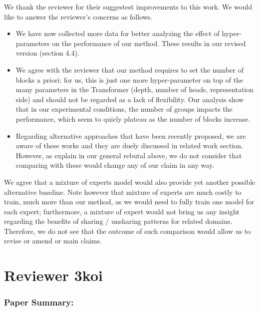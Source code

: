 \documentclass[12pt,times,a4paper,twoside]{article}
\theoremstyle{definition}
\begin{document}
{\color{blue}
We thank the reviewer for their suggestest improvements to this work. We would like to answer the reviewer's concerns as follows.

\begin{itemize}
\item %
  We have now collected more data for better analyzing the effect of hyper-parameters on the performance of our method. These results in our revised version (section 4.4).
  
\item We agree with the reviewer that our method requires to set the number of blocks a priori: for us, this is just one more hyper-parameter on top of the many parameters in the Transformer (depth, number of heads, representation side) and should not be regarded as a lack of flexibility. Our analysis show that in our experimental conditions, the number of groups impacts the performance, which seem to quicly plateau as the number of blocks increase.
  
\item Regarding alternative approaches that have been recently proposed, we are aware of these works and they are duely discussed in related work section. However, as explain in our general rebutal above, we do not consider that comparing with these would change any of our claim in any way.\done{}
\end{itemize}

We agree that a mixture of experts model would also provide yet another possible alternative baseline. Note however that mixture of experts are much costly to train, much more than our method, as we would need to fully train one model for each expert; furthermore, a mixture of expert would not bring us any insight regarding the benefits of sharing / unsharing patterns for related domains. Therefore, we do not see that the outcome of such comparison would allow us to revise or amend or main claims.
}
\section*{Reviewer 3koi}

\subsubsection*{Paper Summary:}
\end{document}
